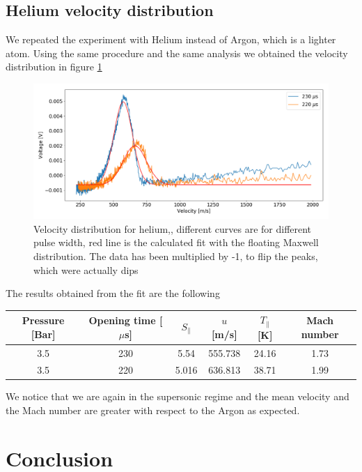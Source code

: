 \documentclass[a4paper,10pt]{article}
\begin{document}
\subsection{Helium velocity distribution}
We repeated the experiment with Helium instead of Argon, which is a lighter atom. Using the same procedure and the same analysis we obtained the velocity distribution in figure \ref{heliumtof}
\begin{figure}[H]
\centering
\includegraphics[width= \textwidth]{heliumtof}
\caption{Velocity distribution for helium,, different curves are for different pulse width, red line is the calculated fit with the floating Maxwell distribution. The data has been multiplied by -1, to flip the peaks, which were actually dips}\label{heliumtof}
\end{figure}
The results obtained from the fit are the following

\begin{center}
\begin{tabular}{cccccc} \toprule
Pressure [Bar] & Opening time [$\mu$s] & $S_\parallel$ & $u$ [m/s] & $T_\parallel$ [K] & Mach number \\ \midrule
3.5 & 230 & 5.54 & 555.738& 24.16& 1.73\\
3.5& 220 & 5.016& 636.813& 38.71& 1.99 \\\bottomrule
\end{tabular}
\end{center}
We notice that we are again in the supersonic regime and the mean velocity and the Mach number are greater with respect to the Argon as expected.
\section{Conclusion}
\end{document}
